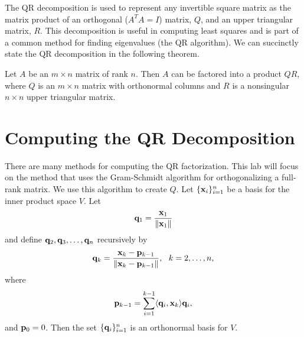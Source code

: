 \label{lab:QRdecomp}

The QR decomposition is used to represent any invertible square matrix as the matrix product of an orthogonal ($A^T A = I$) matrix, $Q$, and an upper triangular matrix, $R$.
This decomposition is useful in computing least squares and is part of a common method for finding eigenvalues (the QR algorithm).
We can succinctly state the QR decomposition in the following theorem.
\begin{theorem}
Let $A$ be an $m\times n$ matrix of rank $n$.  Then $A$ can be
factored into a product $Q R$, where $Q$ is an $m\times n$ matrix
with orthonormal columns and $R$ is a nonsingular $n \times n$ upper
triangular matrix.
\end{theorem}

\section*{Computing the QR Decomposition}
There are many methods for computing the QR factorization.
This lab will focus on the method that uses the Gram-Schmidt algorithm for orthogonalizing 
a full-rank matrix.
We use this algorithm to create $Q$.
Let $\{{\bf x}_i\}_{i=1}^n$ be a basis for the inner product space $V$.
Let \[ {\bf q}_1 = \frac{{\bf x}_1}{\left\lVert{\bf x}_1\right\rVert}\] and define ${\bf q}_2,{\bf q}_3,\ldots,{\bf q}_n$ recursively by
$$ 
{\bf q}_{k} = \frac{{\bf x}_k - {\bf p}_{k-1}}{\|{\bf x}_k - {\bf p}_{k-1}\|}, \,\,\,\, k=2,\ldots,n,
$$
where
$$
{\bf p}_{k-1} = \sum_{i=1}^{k-1} \langle {\bf q}_i, {\bf x}_k\rangle {\bf q}_i,
$$
and ${\bf p}_0 = 0$. 
Then the set $\{{\bf q}_i\}_{i=1}^n$ is an orthonormal basis for $V$.

